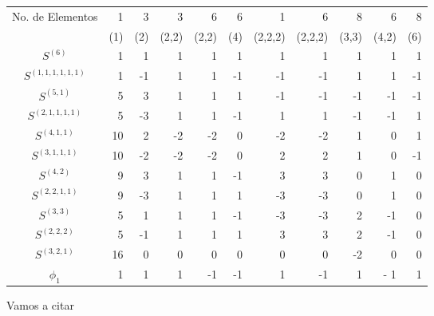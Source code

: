 \documentclass[12pt]{book}
\theoremstyle{definition}
\newcounter{in}
\begin{document}
\begin{tabular}{c |r r r r r r r r r r}
No. de Elementos  & 1 & 3 & 3 & 6 & 6 & 1 & 6 & 8 & 6 & 8 \\
 &(1)& (2) & (2,2) & (2,2) & (4)& (2,2,2) & (2,2,2) & (3,3) & (4,2) & (6)\\
    \hline
  $S^{{(6)}}$         & 1 & 1  & 1  & 1 & 1 &1  & 1 & 1 & 1 & 1 \\
  $S^{{(1,1,1,1,1,1)}}$ & 1 & -1 & 1  & 1 & -1&-1 &-1 & 1 & 1 & -1 \\
  $S^{{(5,1)}}$       & 5 & 3  & 1  & 1 & 1 &-1 &-1 &-1 &-1 & -1 \\
  $S^{{(2,1,1,1,1)}}$  & 5 & -3 &  1 & 1 &-1 & 1 & 1 &-1  &-1 & 1 \\
  $S^{{(4,1,1)}}$     & 10& 2  & -2 & -2& 0 &-2 &-2 & 1  & 0 & 1 \\
  $S^{{(3,1,1,1)}}$    & 10&-2  & -2 &-2 & 0 & 2 & 2 & 1 & 0 & -1 \\
  $S^{{(4,2)}}$       & 9 & 3  & 1  & 1 & -1& 3 & 3 & 0 & 1 &  0 \\
  $S^{{(2,2,1,1)}}$    & 9 & -3 & 1  & 1 & 1 &-3 &-3 & 0 & 1 &  0 \\
  $S^{{(3,3)}}$       & 5 & 1  & 1  & 1 &-1 &-3 & -3& 2 &-1 &  0 \\
  $S^{{(2,2,2)}}$     & 5  & -1& 1  & 1 & 1 & 3 & 3 & 2 & -1 & 0 \\
  $S^{{(3,2,1)}}$     & 16 & 0 & 0  & 0 & 0 & 0 & 0 & -2 & 0 & 0 \\
  \hline
  $\phi_{1}$ & 1 & 1 & 1 & -1 & -1 & 1 &-1 & 1 &- 1 & 1  \\
\end{tabular}

Vamos a citar \cite{MR0225619}




\printindex
\end{document}
